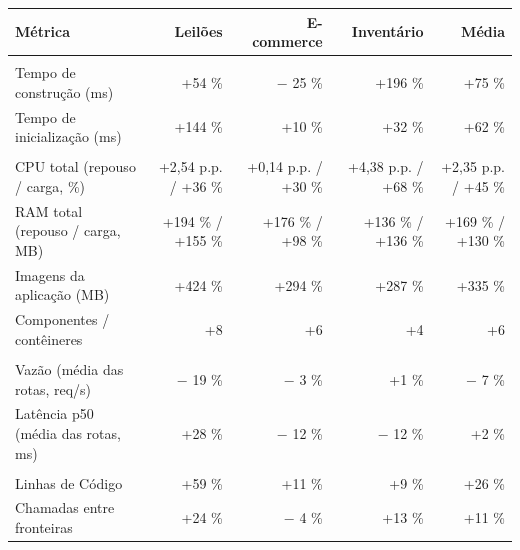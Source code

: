\begin{quadro}[htb]
  \centering
  \caption{Variação acumulada por aplicação --- Capacidade de Negócio.}
  \label{qua:comp_capacidade-negocio_variacoes}
  \renewcommand{\arraystretch}{1.15}
  \setlength{\tabcolsep}{3pt}
  \footnotesize
  \begin{tabularx}{\textwidth}{|>{\raggedright\arraybackslash}X|r|r|r|r|}
    \hline
    \textbf{Métrica} & \textbf{Leilões} & \textbf{E-commerce} & \textbf{Inventário} & \textbf{Média} \\
    \hline
    \multicolumn{5}{|l|}{\textbf{Agilidade}} \\
    \hline
    Tempo de construção (ms) & +54 \% & $-$ 25 \% & +196 \% & +75 \% \\
    Tempo de inicialização (ms) & +144 \% & +10 \% & +32 \% & +62 \% \\
    \hline
    \multicolumn{5}{|l|}{\textbf{Custo}} \\
    \hline
    CPU total (repouso / carga, \%) & +2,54 p.p. / +36 \% & +0,14 p.p. / +30 \% & +4,38 p.p. / +68 \% & +2,35 p.p. / +45 \% \\
    RAM total (repouso / carga, MB) & +194 \% / +155 \% & +176 \% / +98 \% & +136 \% / +136 \% & +169 \% / +130 \% \\
    Imagens da aplicação (MB) & +424 \% & +294 \% & +287 \% & +335 \% \\
    Componentes / contêineres & +8 & +6 & +4 & +6 \\
    \hline
    \multicolumn{5}{|l|}{\textbf{Desempenho}} \\
    \hline
    Vazão (média das rotas, req/s) & $-$ 19 \% & $-$ 3 \% & +1 \% & $-$ 7 \% \\
    Latência p50 (média das rotas, ms) & +28 \% & $-$ 12 \% & $-$ 12 \% & +2 \% \\
    \hline
    \multicolumn{5}{|l|}{\textbf{Manutenibilidade}} \\
    \hline
    Linhas de Código & +59 \% & +11 \% & +9 \% & +26 \% \\
    Chamadas entre fronteiras & +24 \% & $-$ 4 \% & +13 \% & +11 \% \\
    \hline
  \end{tabularx}
\end{quadro}
